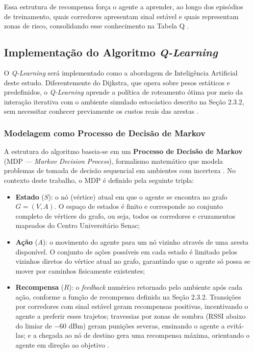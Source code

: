 \documentclass[
    12pt,                %
    openright,           %
    oneside,             %
    a4paper,             %
    english,             %
    brazil               %
]{abntex2}
\begin{document}
Essa estrutura de recompensa força o agente a aprender, ao longo dos episódios de
treinamento, quais corredores apresentam sinal estável e quais representam zonas de
risco, consolidando esse conhecimento na Tabela Q \cite{Sutton2018}.

\subsection{Implementação do Algoritmo \textit{Q-Learning}}

O \textit{Q-Learning} será implementado como a abordagem de Inteligência Artificial
deste estudo. Diferentemente do Dijkstra, que opera sobre pesos estáticos e
predefinidos, o \textit{Q-Learning} aprende a política de roteamento ótima por meio
da interação iterativa com o ambiente simulado estocástico descrito na Seção 2.3.2,
sem necessitar conhecer previamente os custos reais das arestas \cite{Sutton2018}.

\subsubsection*{Modelagem como Processo de Decisão de Markov}

A estrutura do algoritmo baseia-se em um \textbf{Processo de Decisão de Markov}
(MDP --- \textit{Markov Decision Process}), formalismo matemático que modela
problemas de tomada de decisão sequencial em ambientes com incerteza
\cite{Sutton2018}. No contexto deste trabalho, o MDP é definido pela seguinte
tripla:

\begin{itemize}
    \item \textbf{Estado} ($S$): o nó (vértice) atual em que o agente se encontra
    no grafo $G = (V, A)$. O espaço de estados é finito e corresponde ao conjunto
    completo de vértices do grafo, ou seja, todos os corredores e cruzamentos
    mapeados do Centro Universitário Senac;

    \item \textbf{Ação} ($A$): o movimento do agente para um nó vizinho através de
    uma aresta disponível. O conjunto de ações possíveis em cada estado é limitado
    pelos vizinhos diretos do vértice atual no grafo, garantindo que o agente só
    possa se mover por caminhos fisicamente existentes;

    \item \textbf{Recompensa} ($R$): o \textit{feedback} numérico retornado pelo
    ambiente após cada ação, conforme a função de recompensa definida na Seção
    2.3.2. Transições por corredores com sinal estável geram recompensas positivas,
    incentivando o agente a preferir esses trajetos; travessias por zonas de sombra
    (RSSI abaixo do limiar de $-60$ dBm) geram punições severas, ensinando o agente
    a evitá-las; e a chegada ao nó de destino gera uma recompensa máxima, orientando
    o agente em direção ao objetivo \cite{Sutton2018}.
\end{itemize}
\end{document}
